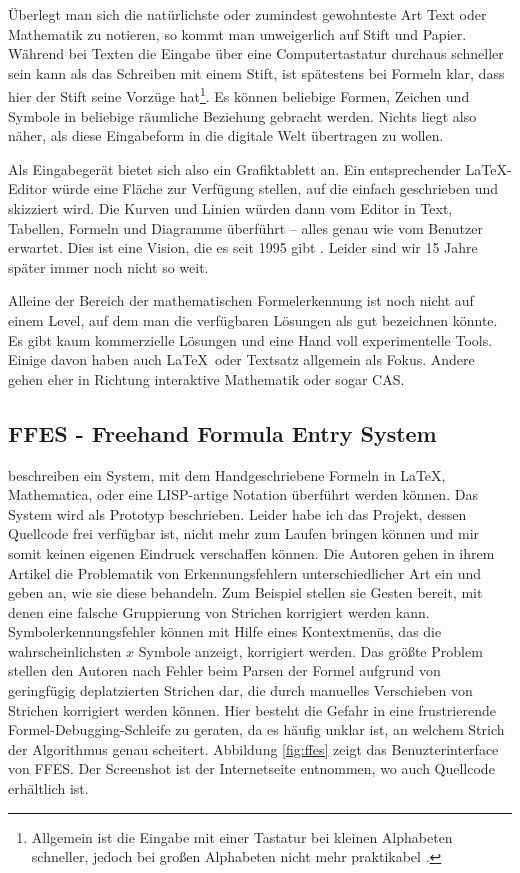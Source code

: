 Überlegt man sich die natürlichste oder zumindest gewohnteste Art Text oder Mathematik zu notieren, so kommt man unweigerlich auf Stift und Papier. Während bei Texten die Eingabe über eine Computertastatur durchaus schneller sein kann als das Schreiben mit einem Stift, ist spätestens bei Formeln klar, dass hier der Stift seine Vorzüge hat\footnote{Allgemein ist die Eingabe mit einer Tastatur bei kleinen Alphabeten schneller, jedoch bei großen Alphabeten nicht mehr praktikabel \cite{Tappert:1990p10302}.}. Es können beliebige Formen, Zeichen und Symbole in beliebige räumliche Beziehung gebracht werden. Nichts liegt also näher, als diese Eingabeform in die digitale Welt übertragen zu wollen.

Als Eingabegerät bietet sich also ein Grafiktablett an. Ein entsprechender \LaTeX-Editor würde eine Fläche zur Verfügung stellen, auf die einfach geschrieben und skizziert wird. Die Kurven und Linien würden dann vom Editor in Text, Tabellen, Formeln und Diagramme überführt -- alles genau wie vom Benutzer erwartet. Dies ist eine Vision, die es seit 1995 gibt \cite{Meyer:1995p10480}. Leider sind wir 15 Jahre später immer noch nicht so weit.

Alleine der Bereich der mathematischen Formelerkennung ist noch nicht auf einem Level, auf dem man die verfügbaren Lösungen als gut bezeichnen könnte. Es gibt kaum kommerzielle Lösungen und eine Hand voll experimentelle Tools. Einige davon haben auch \LaTeX~oder Textsatz allgemein als Fokus. Andere gehen eher in Richtung interaktive Mathematik oder sogar \ac{CAS}.

\subsection[FFES]{FFES - Freehand Formula Entry System}
\label{sub:ffes}

\citet{Smithies:1999p11806} beschreiben ein System, mit dem Handgeschriebene Formeln in \LaTeX, Mathematica, oder eine LISP-artige Notation überführt werden können. Das System wird als Prototyp beschrieben. Leider habe ich das Projekt, dessen Quellcode frei verfügbar ist, nicht mehr zum Laufen bringen können und mir somit keinen eigenen Eindruck verschaffen können. Die Autoren gehen in ihrem Artikel die Problematik von Erkennungsfehlern unterschiedlicher Art ein und geben an, wie sie diese behandeln. Zum Beispiel stellen sie Gesten bereit, mit denen eine falsche Gruppierung von Strichen korrigiert werden kann. Symbolerkennungsfehler können mit Hilfe eines Kontextmenüs, das die wahrscheinlichsten $x$ Symbole anzeigt, korrigiert werden. Das größte Problem stellen den Autoren nach Fehler beim Parsen der Formel aufgrund von geringfügig deplatzierten Strichen dar, die durch manuelles Verschieben von Strichen korrigiert werden können. Hier besteht die Gefahr in eine frustrierende Formel-Debugging-Schleife zu geraten, da es häufig unklar ist, an welchem Strich der Algorithmus genau scheitert. Abbildung \ref{fig:ffes} zeigt das Benuzterinterface von FFES. Der Screenshot ist der Internetseite \cite{ffes} entnommen, wo auch Quellcode erhältlich ist.

